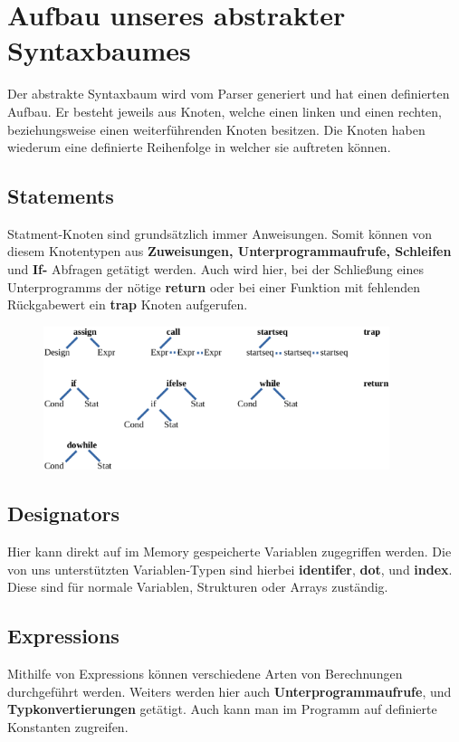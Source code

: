 \section{Aufbau unseres abstrakter Syntaxbaumes}
Der abstrakte Syntaxbaum wird vom Parser generiert und hat einen definierten Aufbau. Er besteht jeweils aus Knoten, welche einen linken und einen rechten, beziehungsweise einen weiterführenden Knoten besitzen. Die Knoten haben wiederum eine definierte Reihenfolge in welcher sie auftreten können. 

\subsection{Statements}
Statment-Knoten sind grundsätzlich immer Anweisungen. Somit können von diesem Knotentypen aus \textbf{Zuweisungen, Unterprogrammaufrufe, Schleifen} und \textbf{If-} Abfragen getätigt werden. Auch wird hier, bei der Schließung eines Unterprogramms der nötige \textbf{return} oder bei einer Funktion mit fehlenden Rückgabewert ein \textbf{trap} Knoten aufgerufen. 

\begin{figure}[h] 
  \centering
     \includegraphics[width=0.9\textwidth]{./media/images/interpreter/statements.png}
  \label{fig:Statements}
\end{figure}


\subsection{Designators}
Hier kann direkt auf im Memory gespeicherte Variablen zugegriffen werden. Die von uns unterstützten Variablen-Typen sind hierbei \textbf{identifer}, \textbf{dot}, und \textbf{index}. Diese sind für normale Variablen, Strukturen oder Arrays zuständig.

\subsection{Expressions}
\label{sec:expressions}
Mithilfe von Expressions können verschiedene Arten von Berechnungen durchgeführt werden. Weiters werden hier auch \textbf{Unterprogrammaufrufe}, und \textbf{Typkonvertierungen} getätigt. Auch kann man im Programm auf definierte Konstanten zugreifen.

